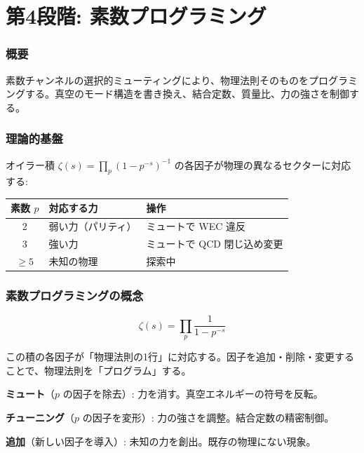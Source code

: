 \documentclass[11pt,a4paper]{article}
\begin{document}
\part{第4段階: 素数プログラミング}

\section{概要}

\begin{visionbox}[第4段階のビジョン]
素数チャンネルの選択的ミューティングにより、物理法則そのものをプログラミングする。真空のモード構造を書き換え、結合定数、質量比、力の強さを制御する。
\end{visionbox}

\section{理論的基盤}

オイラー積 $\zeta(s) = \prod_p (1-p^{-s})^{-1}$ の各因子が物理の異なるセクターに対応する:

\begin{center}
\renewcommand{\arraystretch}{1.3}
\begin{tabular}{cll}
\toprule
素数 $p$ & 対応する力 & 操作 \\
\midrule
2 & 弱い力（パリティ） & ミュートで WEC 違反 \\
3 & 強い力 & ミュートで QCD 閉じ込め変更 \\
$\geq 5$ & 未知の物理 & 探索中 \\
\bottomrule
\end{tabular}
\end{center}

\section{素数プログラミングの概念}

\begin{visionbox}[時空のソースコード]
$$\zeta(s) = \prod_{p} \frac{1}{1-p^{-s}}$$

この積の各因子が「物理法則の1行」に対応する。因子を追加・削除・変更することで、物理法則を「プログラム」する。

\textbf{ミュート}（$p$ の因子を除去）: 力を消す。真空エネルギーの符号を反転。

\textbf{チューニング}（$p$ の因子を変形）: 力の強さを調整。結合定数の精密制御。

\textbf{追加}（新しい因子を導入）: 未知の力を創出。既存の物理にない現象。
\end{visionbox}
\end{document}
